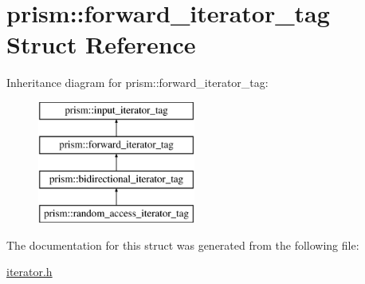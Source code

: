 \hypertarget{structprism_1_1forward__iterator__tag}{}\section{prism\+:\+:forward\+\_\+iterator\+\_\+tag Struct Reference}
\label{structprism_1_1forward__iterator__tag}
Inheritance diagram for prism\+:\+:forward\+\_\+iterator\+\_\+tag\+:\begin{figure}[H]
\begin{center}
\leavevmode
\includegraphics[height=4.000000cm]{structprism_1_1forward__iterator__tag}
\end{center}
\end{figure}


The documentation for this struct was generated from the following file\+:\begin{DoxyCompactItemize}
\item 
\hyperlink{iterator_8h}{iterator.\+h}\end{DoxyCompactItemize}
